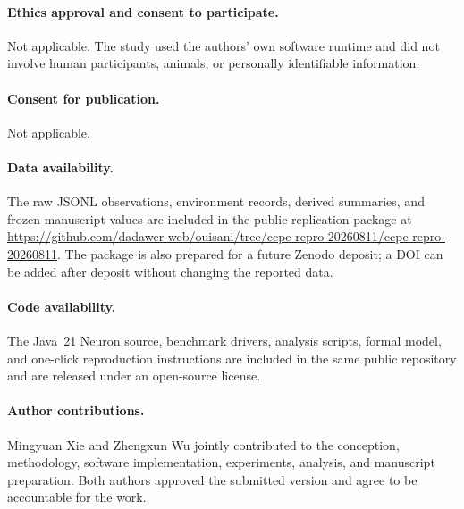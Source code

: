 \paragraph{Ethics approval and consent to participate.}
Not applicable. The study used the authors' own software runtime and did not
involve human participants, animals, or personally identifiable information.

\paragraph{Consent for publication.}
Not applicable.

\paragraph{Data availability.}
The raw JSONL observations, environment records, derived summaries, and
frozen manuscript values are included in the public replication package at
\url{https://github.com/dadawer-web/ouisani/tree/ccpe-repro-20260811/ccpe-repro-20260811}.
The package is also prepared for a future Zenodo deposit; a DOI can be added
after deposit without changing the reported data.

\paragraph{Code availability.}
The Java~21 Neuron source, benchmark drivers, analysis scripts, formal model,
and one-click reproduction instructions are included in the same public
repository and are released under an open-source license.

\paragraph{Author contributions.}
Mingyuan Xie and Zhengxun Wu jointly contributed to the conception,
methodology, software implementation, experiments, analysis, and manuscript
preparation. Both authors approved the submitted version and agree to be
accountable for the work.
